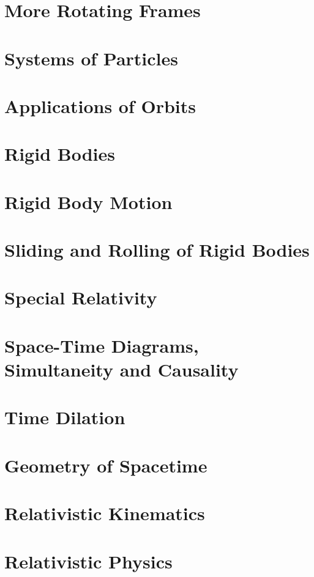 \documentclass{article}
\begin{document}
\section{More Rotating Frames}

\section{Systems of Particles}

\section{Applications of Orbits}

\section{Rigid Bodies}

\section{Rigid Body Motion}

\section{Sliding and Rolling of Rigid Bodies}

\section{Special Relativity}

\section{Space-Time Diagrams, Simultaneity and Causality}

\section{Time Dilation}

\section{Geometry of Spacetime}

\section{Relativistic Kinematics}

\section{Relativistic Physics}

\end{document}
